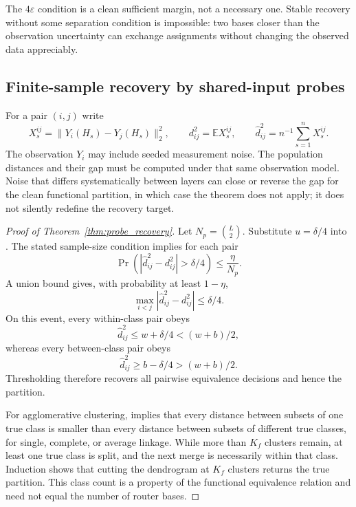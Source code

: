 The $4\varepsilon$ condition is a clean sufficient margin, not a necessary
one.  Stable recovery without some separation condition is impossible: two
bases closer than the observation uncertainty can exchange assignments
without changing the observed data appreciably.

\subsection{Finite-sample recovery by shared-input probes}
\label{app:probe_proof}

For a pair $(i,j)$ write
\begin{equation}
 X_s^{ij}=\|Y_i(H_s)-Y_j(H_s)\|_2^2,
 \qquad
 d_{ij}^2=\mathbb E X_s^{ij},
 \qquad
 \widehat d_{ij}^2=n^{-1}\sum_{s=1}^nX_s^{ij}.
\end{equation}
The observation $Y_i$ may include seeded measurement noise.  The population
distances and their gap must be computed under that same observation model.
Noise that differs systematically between layers can close or reverse the
gap for the clean functional partition, in which case the theorem does not
apply; it does not silently redefine the recovery target.

\begin{proof}[Proof of Theorem~\ref{thm:probe_recovery}]
Let $N_p=\binom{L}{2}$.  Substitute $u=\delta/4$ into
.  The stated sample-size condition implies
for each pair
\begin{equation}
 \Pr\left(
 |\widehat d_{ij}^2-d_{ij}^2|>\delta/4
 \right)
 \le \frac{\eta}{N_p}.
\end{equation}
A union bound gives, with probability at least $1-\eta$,
\begin{equation}
 \max_{i<j}|\widehat d_{ij}^2-d_{ij}^2|\le\delta/4.
 \label{eq:app_uniform_probe}
\end{equation}
On this event, every within-class pair obeys
\begin{equation}
 \widehat d_{ij}^2\le w+\delta/4<(w+b)/2,
\end{equation}
whereas every between-class pair obeys
\begin{equation}
 \widehat d_{ij}^2\ge b-\delta/4>(w+b)/2.
\end{equation}
Thresholding therefore recovers all pairwise equivalence decisions and hence
the partition.

For agglomerative clustering,  implies
that every distance between subsets of one true class is smaller than every
distance between subsets of different true classes, for single, complete, or
average linkage.  While more than $K_f$ clusters remain, at least one true class
is split, and the next merge is necessarily within that class.  Induction
shows that cutting the dendrogram at $K_f$ clusters returns the true
partition.  This class count is a property of the functional equivalence
relation and need not equal the number of router bases.
\end{proof}

